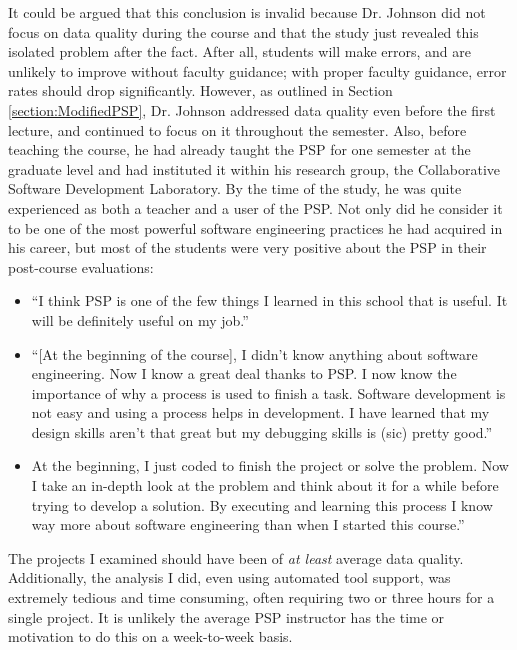 It could be argued 
that this conclusion is invalid because Dr. Johnson did not focus on data
quality during the course and that the study just revealed this isolated
problem after the fact.  After all, students will make errors, and are
unlikely to improve without faculty guidance; with proper faculty guidance,
error rates should drop significantly.  However, as outlined in Section
\ref{section:ModifiedPSP}, Dr. Johnson addressed data quality even before
the first lecture, and continued to focus on it throughout the semester.
Also, before teaching the course, he had already taught the PSP for one
semester at the graduate level and had instituted it within his research
group, the Collaborative Software Development Laboratory.  By the time of
the study, he was quite experienced as both a teacher and a user of the
PSP. Not only did he consider it 
to be one of the most powerful software engineering practices he had
acquired in his career, but most of the students were very positive about
the PSP in their post-course evaluations:

\begin{itemize}
\item ``I think PSP is one of the few things I learned in this school that
is useful.  It will be definitely useful on my job.''
\item ``[At the beginning of the course], I didn't know anything about
software engineering.  Now I know a great deal thanks to PSP.  I now know
the importance of why a process is used to finish a task.  Software
development is not easy and using a process helps in development.  I have
learned that my design skills aren't that great but my debugging skills is
(sic) pretty good.''
\item At the beginning, I just coded to finish the project or solve the
problem.  Now I take an in-depth look at the problem and think about it for 
a while before trying to develop a solution.  By executing and learning
this process I know way more about software engineering than when I started 
this course.''
\end{itemize}
 
The projects I examined should have been of {\it at least} average data
quality.  Additionally, the analysis I did, even using automated tool
support, was extremely tedious and time consuming, often requiring two or
three hours for a single project.  It is unlikely the average PSP
instructor has the time or motivation to do this on a week-to-week basis.

